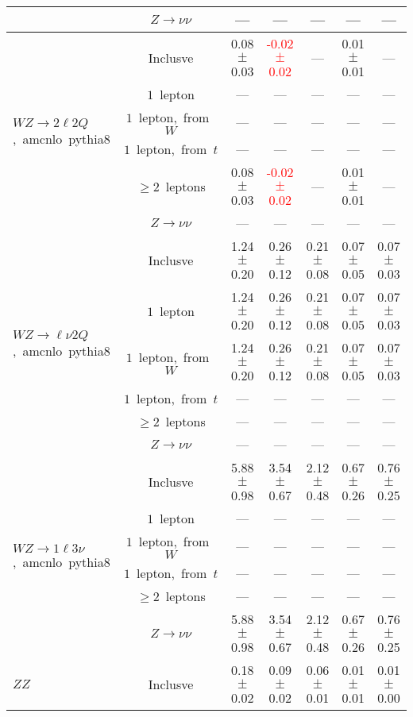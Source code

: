 \documentclass{article}
\begin{document}
\begin{longtable}{|l|c|c|c|c|c|c|}
 & $Z\rightarrow\nu\nu$  & ---  & ---  & ---  & ---  & --- \\* 
\hline 
\multirow{6}{*}{$WZ{\rightarrow}2{\ell}2Q$,~amcnlo~pythia8} & Inclusve  & 0.08 $\pm$ 0.03  & \textcolor{red}{ -0.02 $\pm$ 0.02 }  & ---  & 0.01 $\pm$ 0.01  & --- \\* 
 & $1$~lepton  & ---  & ---  & ---  & ---  & --- \\* 
 & $1$~lepton,~from~$W$  & ---  & ---  & ---  & ---  & --- \\* 
 & $1$~lepton,~from~$t$  & ---  & ---  & ---  & ---  & --- \\* 
 & $\ge2$~leptons  & 0.08 $\pm$ 0.03  & \textcolor{red}{ -0.02 $\pm$ 0.02 }  & ---  & 0.01 $\pm$ 0.01  & --- \\* 
 & $Z\rightarrow\nu\nu$  & ---  & ---  & ---  & ---  & --- \\* 
\hline 
\multirow{6}{*}{$WZ{\rightarrow}{\ell}{\nu}2Q$,~amcnlo~pythia8} & Inclusve  & 1.24 $\pm$ 0.20  & 0.26 $\pm$ 0.12  & 0.21 $\pm$ 0.08  & 0.07 $\pm$ 0.05  & 0.07 $\pm$ 0.03 \\* 
 & $1$~lepton  & 1.24 $\pm$ 0.20  & 0.26 $\pm$ 0.12  & 0.21 $\pm$ 0.08  & 0.07 $\pm$ 0.05  & 0.07 $\pm$ 0.03 \\* 
 & $1$~lepton,~from~$W$  & 1.24 $\pm$ 0.20  & 0.26 $\pm$ 0.12  & 0.21 $\pm$ 0.08  & 0.07 $\pm$ 0.05  & 0.07 $\pm$ 0.03 \\* 
 & $1$~lepton,~from~$t$  & ---  & ---  & ---  & ---  & --- \\* 
 & $\ge2$~leptons  & ---  & ---  & ---  & ---  & --- \\* 
 & $Z\rightarrow\nu\nu$  & ---  & ---  & ---  & ---  & --- \\* 
\hline 
\multirow{6}{*}{$WZ{\rightarrow}1{\ell}3{\nu}$,~amcnlo~pythia8} & Inclusve  & 5.88 $\pm$ 0.98  & 3.54 $\pm$ 0.67  & 2.12 $\pm$ 0.48  & 0.67 $\pm$ 0.26  & 0.76 $\pm$ 0.25 \\* 
 & $1$~lepton  & ---  & ---  & ---  & ---  & --- \\* 
 & $1$~lepton,~from~$W$  & ---  & ---  & ---  & ---  & --- \\* 
 & $1$~lepton,~from~$t$  & ---  & ---  & ---  & ---  & --- \\* 
 & $\ge2$~leptons  & ---  & ---  & ---  & ---  & --- \\* 
 & $Z\rightarrow\nu\nu$  & 5.88 $\pm$ 0.98  & 3.54 $\pm$ 0.67  & 2.12 $\pm$ 0.48  & 0.67 $\pm$ 0.26  & 0.76 $\pm$ 0.25 \\* 
\hline 
\multirow{6}{*}{$ZZ$} & Inclusve  & 0.18 $\pm$ 0.02  & 0.09 $\pm$ 0.02  & 0.06 $\pm$ 0.01  & 0.01 $\pm$ 0.01  & 0.01 $\pm$ 0.00 \\* 

\end{longtable}
\end{document}
